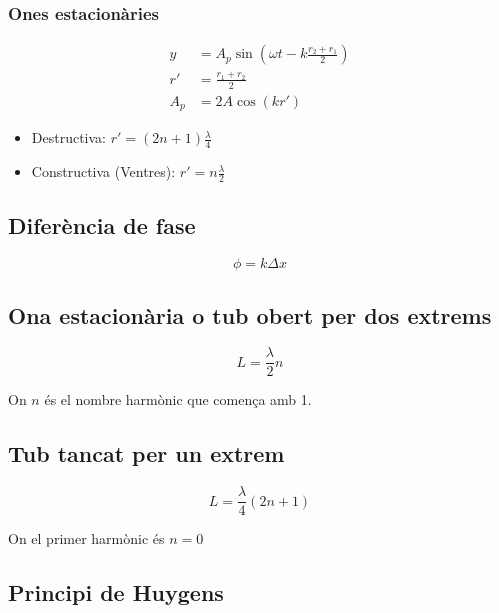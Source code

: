 \subsubsection{Ones estacionàries}
\label{ssub:ones_estacionaries}

\begin{align}
    y &= A_p\sin\left( \omega t -k \frac{r_2+r_1}{2} \right) \\
    r' &= \frac{r_1+r_2}{2} \\
    A_p &= 2A\cos\left( kr' \right)
\end{align}

\begin{itemize}
    \item Destructiva: $r' = (2n+1)\frac{\lambda}{4}$
    \item Constructiva (Ventres): $r' = n\frac{\lambda}{2}$
\end{itemize}

\subsection{Diferència de fase}
\label{sub:diferencia_de_fase}

\begin{equation}
    \phi = k \Delta x
\end{equation}



\subsection{Ona estacionària o tub obert per dos extrems}
\label{sub:ona_estacionaria_o_tub_obert_per_dos_extrems}

\begin{equation}
    L = \frac{\lambda}{2}n
\end{equation}

On $n$ és el nombre harmònic que comença amb 1.

\subsection{Tub tancat per un extrem}
\label{sub:tub_tancat_per_un_extrem}

\begin{equation}
    L = \frac{\lambda}{4}(2n+1)
\end{equation}

On el primer harmònic és $n=0$

\subsection{Principi de Huygens}
\label{sub:principi_de_huygens}

